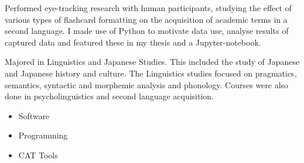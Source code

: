 \documentclass[10pt,a4paper,ragged2e,withhyper]{altacv}
\begin{document}
\begin{paracol}{2}
\label{sec:orgcfe66d2}




{}
\label{sec:orgef27dbe}
Performed eye-tracking research with human participants, studying the effect of
various types of flashcard formatting on the acquisition of academic terms in a
second language. I made use of Python to motivate data use, analyse results of captured data and featured these in my thesis and a Jupyter-notebook.
\par\divider
{}
Majored in Linguistics and Japanese Studies. This included the study of Japanese and Japanese history and culture. The Linguistics studies focused on pragmatics, semantics, syntactic and morphemic analysis and phonology. Courses were also done in psycholinguistics and second language acquisition.

\label{sec:org4f14b8f}
\begin{itemize}
\item Software
\end{itemize}
\begin{itemize}
\item Programming
\end{itemize}
\cvtag{\LaTeX}
\begin{itemize}
\item CAT Tools
\end{itemize}

\end{paracol}
\end{document}

